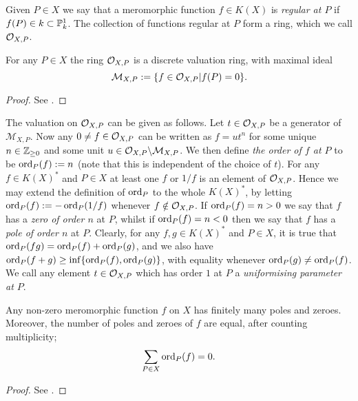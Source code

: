 Given $P \in X$ we say that a meromorphic function $f \in K(X)$ is \emph{regular at $P$} if $f(P) \in k \subset {\mathbb P}_k^1$.
The collection of functions regular at $P$ form a ring, which we call ${\cal O}_{X,P}$.

    \begin{lem}
    For any $P \in X$ the ring ${\cal O}_{X,P}$ is a discrete valuation ring, with maximal ideal
        \[
        \mathcal {M}_{X,P} := \{ f \in {\cal O}_{X,P} | f(P) = 0 \}.
        \]
    \end{lem}
    \begin{proof}
    See \cite[Chap.\ 1, \S 4]{fulton}.
    \end{proof}

The valuation on ${\cal O}_{X,P}$ can be given as follows.
Let $t \in {\cal O}_{X,P}$ be a generator of $\mathcal{M}_{X,P}$.
Now any $0 \neq f \in {\cal O}_{X,P}$ can be written as $f = ut^n$ for some unique $n \in {\mathbb Z}_{\geq 0}$ and some unit $u \in {\cal O}_{X,P}\backslash \mathcal{M}_{X,P}$.
We then define \emph{the order of $f$ at $P$} to be $\operatorname{ord}_P(f) := n$ (note that this is independent of the choice of $t$).
For any $f \in K(X)^*$ and $P \in X$ at least one $f$ or $1/f$ is an element of $ {\cal O}_{X,P}$.
Hence we may extend the definition of $\operatorname{ord}_P$ to the whole $K(X)^*$, by letting $\operatorname{ord}_P(f) := - \operatorname{ord}_P(1/f)$ whenever $f \notin {\cal O}_{X,P}$.
If $\operatorname{ord}_P(f) = n >0$ we say that $f$ has a \emph{zero of order $n$} at $P$, whilst if $\operatorname{ord}_P(f) = n < 0$ then we say that $f$ has a \emph{pole of order $n$} at $P$.
Clearly, for any $f, g \in K(X)^*$ and $P \in X$, it is true that $\operatorname{ord}_P(fg) = \operatorname{ord}_P(f) + \operatorname{ord}_P(g)$, and we also have $\operatorname{ord}_P(f + g) \geq \inf\{\operatorname{ord}_P(f), \operatorname{ord}_P(g)\}$, with equality whenever $\operatorname{ord}_P(g) \neq \operatorname{ord}_P(f)$.
We call any element $t \in {\cal O}_{X,P}$ which has order $1$ at $P$ a \emph{uniformising parameter at $P$}.

    \begin{prop}\label{propfinitelymanyzeroesandpoles}
    Any non-zero meromorphic function $f$ on $X$ has finitely many poles and zeroes.
    Moreover, the number of poles and zeroes of $f$ are equal, after counting multiplicity; \ie 
        \[
        \sum_{P \in X} \operatorname{ord}_P(f) = 0.
        \]
    \end{prop}
    \begin{proof}
    See \cite[Chap.\ 8, \S 1, Prop.\ 1]{fulton}.
    \end{proof}


